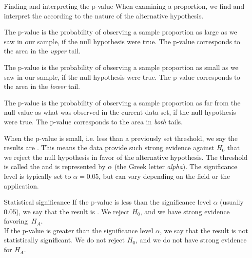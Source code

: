 \begin{onebox}{Finding and interpreting the p-value}
When examining a proportion, we find and interpret the  according to the nature of the alternative hypothesis.\vspace{-1mm}
\begin{description}
\setlength{\itemsep}{0mm}
\item[$H_A$: $p > p_0.$ ] The p-value is the probability of observing a sample proportion as large as we saw in our sample, if the null hypothesis were true. The p-value corresponds to the area in the \emph{upper} tail.
\item[$H_A$: $p < p_0.$ ]The p-value is the probability of observing a sample proportion as small as we saw in our sample, if the null hypothesis were true. The p-value corresponds to the area in the \emph{lower} tail.
\item[$H_A$: $p \ne p_0.$] The p-value is the probability of observing a sample proportion as far from the null value as what was observed in the current data set, if the null hypothesis were true. The p-value corresponds to the area in \emph{both} tails.
\end{description}\end{onebox}

When the p-value is small, i.e. less than a previously set threshold, we say the results are . This means the data provide such strong evidence against $H_0$ that we reject the null hypothesis in favor of the alternative hypothesis. The threshold is called the  and is represented by $\alpha$ (the Greek letter \emph{alpha}\label{alphadiscussion}).  The significance level is typically set to $\alpha = 0.05$, but can vary depending on the field or the application. %

\begin{onebox}{Statistical significance}
If the p-value is less than the significance level $\alpha$ (usually 0.05), we say that the result is . We reject $H_0$, and we have strong evidence favoring~$H_A$. \\[2mm]
If the p-value is greater than the significance level $\alpha$, we say that the result is not statistically significant. We do not reject $H_0$, and we do not have strong evidence for $H_A$.\end{onebox}

